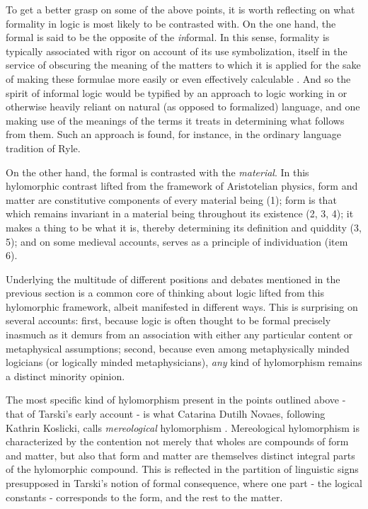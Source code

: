 \documentclass[]{article}
\begin{document}
To get a better grasp on some of the above points, it is worth reflecting on what formality in logic is most likely to be contrasted with. On the one hand, the formal is said to be the opposite of the \textit{in}formal. In this sense, formality is typically associated with rigor on account of its use symbolization, itself in the service of obscuring the meaning of the matters to which it is applied for the sake of making these formulae more easily or even effectively calculable \cite[321-325]{DutilhNavoes2011}. And so the spirit of informal logic would be typified by an approach to logic working in or otherwise heavily reliant on natural (as opposed to formalized) language, and one making use of the meanings of the terms it treats in determining what follows from them. Such an approach is found, for instance, in the ordinary language tradition of Ryle.

On the other hand, the formal is contrasted with the \textit{material}. In this hylomorphic contrast lifted from the framework of Aristotelian physics, form and matter are constitutive components of every material being (1); form is that which remains invariant in a material being throughout its existence (2, 3, 4); it makes a thing to be what it is, thereby determining its definition and quiddity (3, 5); and on some medieval accounts, serves as a principle of individuation (item 6).

Underlying the multitude of different positions and debates mentioned in the previous section is a common core of thinking about logic lifted from this hylomorphic framework, albeit manifested in different ways. This is surprising on several accounts: first, because logic is often thought to be formal precisely inasmuch as it demurs from an association with either any particular content or metaphysical assumptions; second, because even among metaphysically minded logicians (or logically minded metaphysicians), \textit{any} kind of hylomorphism remains a distinct minority opinion.

The most specific kind of hylomorphism present in the points outlined above - that of Tarski's early account - is what Catarina Dutilh Novaes, following Kathrin Koslicki, calls \textit{mereological} hylomorphism \cite{DutilhNovaes2012b} \cite{Koslicki2006}. Mereological hylomorphism is characterized by the contention not merely that wholes are compounds of form and matter, but also that form and matter are themselves distinct integral parts of the hylomorphic compound. This is reflected in the partition of linguistic signs presupposed in Tarski's notion of formal consequence, where one part - the logical constants  - corresponds to the form, and the rest to the matter.
\end{document}
